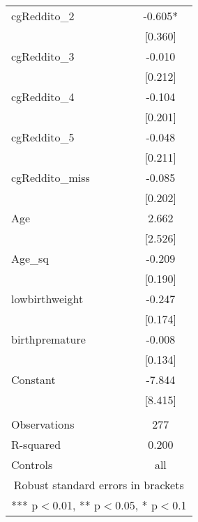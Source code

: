 \documentclass[]{article}
\begin{document}
\begin{tabular}{lc}
cgReddito\_2 & -0.605* \\
 & [0.360] \\
cgReddito\_3 & -0.010 \\
 & [0.212] \\
cgReddito\_4 & -0.104 \\
 & [0.201] \\
cgReddito\_5 & -0.048 \\
 & [0.211] \\
cgReddito\_miss & -0.085 \\
 & [0.202] \\
Age & 2.662 \\
 & [2.526] \\
Age\_sq & -0.209 \\
 & [0.190] \\
lowbirthweight & -0.247 \\
 & [0.174] \\
birthpremature & -0.008 \\
 & [0.134] \\
Constant & -7.844 \\
 & [8.415] \\
 &  \\
Observations & 277 \\
R-squared & 0.200 \\
 Controls & all \\ \hline
\multicolumn{2}{c}{ Robust standard errors in brackets} \\
\multicolumn{2}{c}{ *** p$<$0.01, ** p$<$0.05, * p$<$0.1} \\
\end{tabular}
\end{document}
